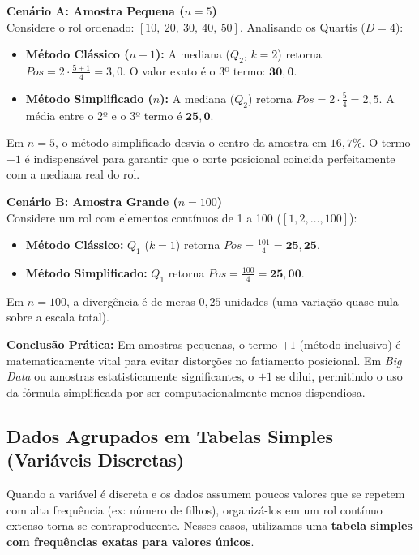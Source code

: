 \documentclass[12pt,a4paper]{article}
\begin{document}
\vspace{0.3cm}
\noindent \textbf{Cenário A: Amostra Pequena ($n = 5$)} \\
Considere o rol ordenado: $[10, \ 20, \ 30, \ 40, \ 50]$. Analisando os Quartis ($D=4$):
\begin{itemize}
    \item \textbf{Método Clássico ($n+1$):} A mediana ($Q_2$, $k=2$) retorna $Pos = 2 \cdot \frac{5+1}{4} = 3,0$. O valor exato é o 3º termo: $\mathbf{30,0}$.
    \item \textbf{Método Simplificado ($n$):} A mediana ($Q_2$) retorna $Pos = 2 \cdot \frac{5}{4} = 2,5$. A média entre o 2º e o 3º termo é $\mathbf{25,0}$.
\end{itemize}
Em $n=5$, o método simplificado desvia o centro da amostra em $16,7\%$. O termo $+1$ é indispensável para garantir que o corte posicional coincida perfeitamente com a mediana real do rol.

\vspace{0.3cm}
\noindent \textbf{Cenário B: Amostra Grande ($n = 100$)} \\
Considere um rol com elementos contínuos de 1 a 100 ($[1, 2, \dots, 100]$):
\begin{itemize}
    \item \textbf{Método Clássico:} $Q_1$ ($k=1$) retorna $Pos = \frac{101}{4} = \mathbf{25,25}$. 
    \item \textbf{Método Simplificado:} $Q_1$ retorna $Pos = \frac{100}{4} = \mathbf{25,00}$.
\end{itemize}
Em $n=100$, a divergência é de meras $0,25$ unidades (uma variação quase nula sobre a escala total). 

\vspace{0.3cm}
\noindent \textbf{Conclusão Prática:} Em amostras pequenas, o termo $+1$ (método inclusivo) é matematicamente vital para evitar distorções no fatiamento posicional. Em \textit{Big Data} ou amostras estatisticamente significantes, o $+1$ se dilui, permitindo o uso da fórmula simplificada por ser computacionalmente menos dispendiosa.

\subsection{Dados Agrupados em Tabelas Simples (Variáveis Discretas)}
Quando a variável é discreta e os dados assumem poucos valores que se repetem com alta frequência (ex: número de filhos), organizá-los em um rol contínuo extenso torna-se contraproducente. Nesses casos, utilizamos uma \textbf{tabela simples com frequências exatas para valores únicos}.
\end{document}
